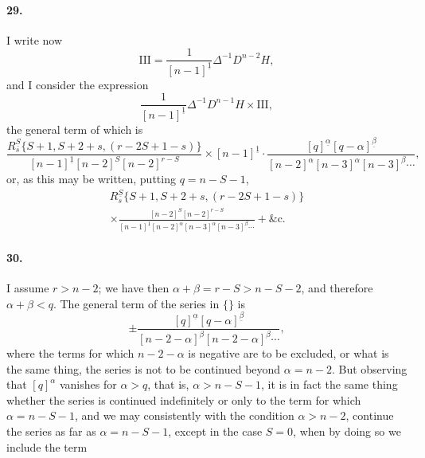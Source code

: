 \documentclass[12pt,a4paper]{article}
\theoremstyle{plain}
\begin{document}
\newpage

\paragraph{29.}
I  write  now
\[
\mathrm{III} = \frac{1}{[n-1]^{\underline{1}}} \Delta^{-1} D^{n-2} H,
\]
and  I  consider  the  expression
\[
\frac{1}{[n-1]^{\underline{1}}} \Delta^{-1} D^{n-1} H \times \mathrm{III},
\]
the  general  term  of  which  is
\[
\frac{R_s^{\underline{S}} \{S+1, S+2+s, (r-2S+1-s)\}}
     {[n-1]^{\underline{1}} [n-2]^S [n-2]^{r-S}}
  \times [n-1]^{\underline{1}} \cdot \frac{[q]^{\underline{\alpha}} [q-\alpha]^{\underline{\beta}}}
     {[n-2]^\alpha [n-3]^\alpha [n-3]^\beta \cdots},
\]
or,  as  this  may  be  written,  putting  $q = n - S - 1$,
\begin{multline*}
R_s^{\underline{S}} \{S+1, S+2+s, (r-2S+1-s)\} \\
\times \frac{[n-2]^S [n-2]^{r-S}}
     {[n-1]^{\underline{1}} [n-2]^\alpha [n-3]^\alpha [n-3]^\beta \cdots} + \text{\&c.}
\end{multline*}

\paragraph{30.}
I  assume  $r > n - 2$;  we  have  then  $\alpha + \beta = r - S > n - S - 2$,  and  therefore
$\alpha + \beta < q$.     The  general  term  of  the  series  in  $\{\}$  is
\[
\pm \frac{[q]^{\underline{\alpha}} [q-\alpha]^{\underline{\beta}}}
     {[n-2-\alpha]^\beta [n-2-\alpha]^\beta \cdots},
\]
where  the  terms  for  which  $n - 2 - \alpha$  is  negative  are  to  be  excluded,  or  what  is  the
same  thing,  the  series  is  not  to  be  continued  beyond  $\alpha = n - 2$.  But  observing  that
$[q]^\alpha$  vanishes  for  $\alpha > q$,  that  is,  $\alpha > n - S - 1$,  it  is  in  fact  the  same  thing  whether  the
series  is  continued  indefinitely  or  only  to  the  term  for  which  $\alpha = n - S - 1$,  and  we
may  consistently  with  the  condition  $\alpha > n - 2$,  continue  the  series  as  far  as  $\alpha = n - S - 1$,
except  in  the  case  $S = 0$,  when  by  doing  so  we  include  the  term

\newpage
\end{document}
